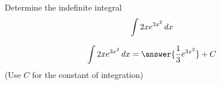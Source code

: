 \documentclass{ximera}
\author{Jason Miller}
\begin{document}
\begin{exercise}
Determine the indefinite integral
\[
\int 2xe^{3x^{2}} \mathop{}\!d  x 
\]



\[
\int 2xe^{3x^{2}} \d x=\answer{\frac{1}{3}e^{3x^{2}}}+C
\]
(Use $C$ for the constant of integration)

\end{exercise}
\end{document}
